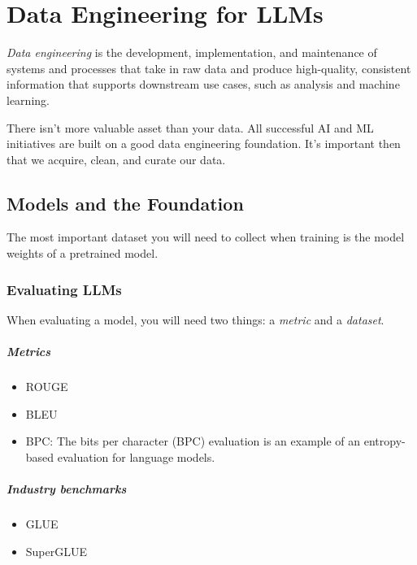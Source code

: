 \chapter{Data Engineering for LLMs}

\textit{Data engineering} is the development, implementation, and maintenance of systems and processes that take in raw data and produce high-quality, consistent information that supports downstream use cases, such as analysis and machine learning. 

There isn't more valuable asset than your data. All successful AI and ML initiatives are built on a good data engineering foundation. It's important then that we acquire, clean, and curate our data. 

\section{Models and the Foundation}
The most important dataset you will need to collect when training is the model weights of a pretrained model. 

\subsection{Evaluating LLMs}
When evaluating a model, you will need two things: \Ni a \textit{metric} and \Nii a \textit{dataset}. 

\paragraph{Metrics}
\begin{itemize}
	\item ROUGE
	\item BLEU
	\item BPC: The bits per character (BPC) evaluation is an example of an entropy-based evaluation for language models. 
\end{itemize}

\paragraph{Industry benchmarks}
\begin{itemize}
	\item GLUE
	\item SuperGLUE
\end{itemize}



